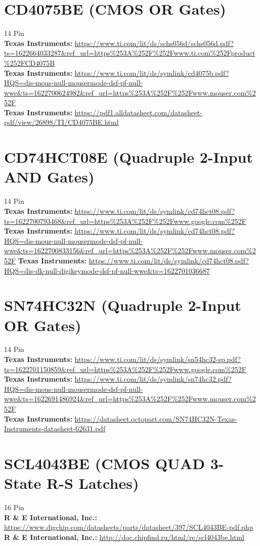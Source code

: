 \documentclass[10pt, letterpaper]{article}
\begin{document}
\section{CD4075BE (CMOS OR Gates)}
14 Pin\\
\textbf{Texas Instruments: } \url{https://www.ti.com/lit/ds/schs056d/schs056d.pdf?ts=1622664033287&ref_url=https%253A%252F%252Fwww.ti.com%252Fproduct%252FCD4075B}\\
\textbf{Texas Instruments: } \url{https://www.ti.com/lit/ds/symlink/cd4075b.pdf?HQS=dis-mous-null-mousermode-dsf-pf-null-wwe&ts=1622700624982&ref_url=https%253A%252F%252Fwww.mouser.com%252F}\\
\textbf{Texas Instruments: } \url{https://pdf1.alldatasheet.com/datasheet-pdf/view/26898/TI/CD4075BE.html}

\section{CD74HCT08E (Quadruple 2-Input AND Gates)}
14 Pin\\
\textbf{Texas Instruments: } \url{https://www.ti.com/lit/ds/symlink/cd74hct08.pdf?ts=1622700793468&ref_url=https%253A%252F%252Fwww.google.com%252F}
\textbf{Texas Instruments: } \url{https://www.ti.com/lit/ds/symlink/cd74hct08.pdf?HQS=dis-mous-null-mousermode-dsf-pf-null-wwe&ts=1622700833156&ref_url=https%253A%252F%252Fwww.mouser.com%252F}
\textbf{Texas Instruments: } \url{https://www.ti.com/lit/ds/symlink/cd74hct08.pdf?HQS=dis-dk-null-digikeymode-dsf-pf-null-wwe&ts=1622701036687}

\section{SN74HC32N (Quadruple 2-Input OR Gates)}
14 Pin\\
\textbf{Texas Instruments: } \url{https://www.ti.com/lit/ds/symlink/sn54hc32-sp.pdf?ts=1622701150859&ref_url=https%253A%252F%252Fwww.google.com%252F}\\
\textbf{Texas Instruments: } \url{https://www.ti.com/lit/ds/symlink/sn74hc32.pdf?HQS=dis-mous-null-mousermode-dsf-pf-null-wwe&ts=1622691486924&ref_url=https%253A%252F%252Fwww.mouser.com%252F}\\
\textbf{Texas Instruments: } \url{https://datasheet.octopart.com/SN74HC32N-Texas-Instruments-datasheet-62631.pdf}

\section{SCL4043BE (CMOS QUAD 3-State R-S Latches)}
16 Pin\\
\textbf{R \& E International, Inc.: } \url{https://www.digchip.com/datasheets/parts/datasheet/397/SCL4043BE-pdf.php}\\
\textbf{R \& E International, Inc.: } \url{http://doc.chipfind.ru/html/re/scl4043be.html}
\end{document}

